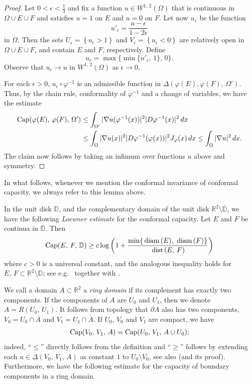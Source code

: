 \documentclass[reqno,11pt]{amsart}
\def\dist{{\mathop\mathrm{\,dist\,}}}
\def\ez{\epsilon}
\def\diam{{\mathop\mathrm{\,diam\,}}}
\numberwithin{equation}{section}
\theoremstyle{remark}
\begin{document}
\begin{proof}
Let $0<\ez<\frac{1}{3}$ and fix a function  $u\in W^{1,\,2}(\Omega)$ that is continuous in $\Omega\cup E\cup F$ and satisfies $u = 1$ on $E$ and $u=0$ on $F$. Let now $u_\varepsilon$ be the function
\[
u'_{\ez} = \frac {{u}-\ez}{1-2\ez}
\]
in $\Omega$. Then the sets $U_{\ez}=\left\{ u_{\ez}>1\right\}$ and $V_{\ez}=\left\{ u_{\ez}< 0\right\}$ are relatively open in $\Omega\cup E \cup F$, and contain $E$ and $F$, respectively. 
Define 
$$u_{\ez}=\max\{\min\{u'_{\ez},\,1\},\,0\}. $$
Observe that $u_{\ez}\to u$ in $W^{1,\,2}(\Omega)$ as $\ez\to 0$.  

For each $\epsilon>0$, $u_\epsilon \circ \varphi^{-1}$ is an admissible function in $\Delta(\varphi(E),\varphi(F),\,\Omega')$. Thus, by the chain rule, conformality of $\varphi^{-1}$ and a change of variables, we have the estimate
\begin{align*}
{\rm Cap}(\varphi(E),\,\varphi(F),\,\Omega')&\le    \int_{\Omega'} |\nabla u(\varphi^{-1}(x))|^2 |D\varphi^{-1}(x)|^2 \, dx\\
&\le  \int_{\Omega} |\nabla u(x)|^2 |D\varphi^{-1}(\varphi(x))|^2 J_{\varphi}(x) \, dx \le \int_\Omega |\nabla u|^2 \, dx.
\end{align*}
The claim now follows by taking an infimum over functions $u$ above and symmetry.
\end{proof}

In what follows, whenever we mention the conformal invariance of conformal capacity, we always refer to this lemma above. 



In the unit disk $\mathbb D$, and the complementary domain of the unit disk $\mathbb R^2\setminus \overline{\mathbb D}$, we have the following \emph{Loewner estimate} for the conformal capacity. Let $E$ and $F$ be continua in $\overline{\mathbb D}$. Then 
\begin{equation}
\label{condition of lower bound}
{\rm Cap}(E,\,F,\,\mathbb D) \ge c \log \left(1+\frac{\min\{\diam (E),\,\diam (F)\}}{\dist(E,\,F)}\right)
\end{equation}
where $c>0$ is a universal constant, and the analogous inequality holds for  $E,\,F\subset \mathbb R^2 \setminus {\mathbb D}$; see e.g.\ \cite[Lemma 7.38]{V1988}  together with \cite[Remark 2.12]{GM1985 2}. 


We call a domain $A\subset\mathbb R^2$ a {\it ring domain} if its complement has exactly two components. If the components of $A$ are $U_0$ and $U_1$, then we denote $A=R(U_0,\,U_1)$. 
It follows from topology that $\partial A$ also has two components, $V_0=U_0\cap \overline{A}$ and $V_1=U_1\cap \overline{A}$.  If $U_0$, $V_0$ and $V_1$ are compact, we have
\begin{equation}\label{same capacity}
  {\rm Cap}( V_0,\, V_1 ,\,A)= {\rm Cap}( U_0,\, V_1 ,\, A\cup U_0 ); 
\end{equation}
indeed, ``$\le$'' directly follows from the definition and ``$\ge$'' follows by extending each $u\in \Delta(V_0,\,V_1,\,A)$ as constant $1$ to $U_0\setminus V_0$, see also \cite[Theorem 11.3]{V1971} (and its proof). 
Furthermore, we have the following estimate for the capacity of boundary components in a ring domain. 
\end{document}
